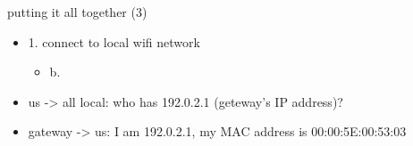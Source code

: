 \begin{frame}{putting it all together (3)}
    \begin{itemize}
    \item 1. connect to local wifi network
        \begin{itemize}
        \item b. 
        \end{itemize}
    \vspace{.5cm}
    \item<2-> us -> all local: who has 192.0.2.1 (geteway's IP address)?
    \item<2-> gateway -> us: I am 192.0.2.1, my MAC address is 00:00:5E:00:53:03
    \end{itemize}
\end{frame}

